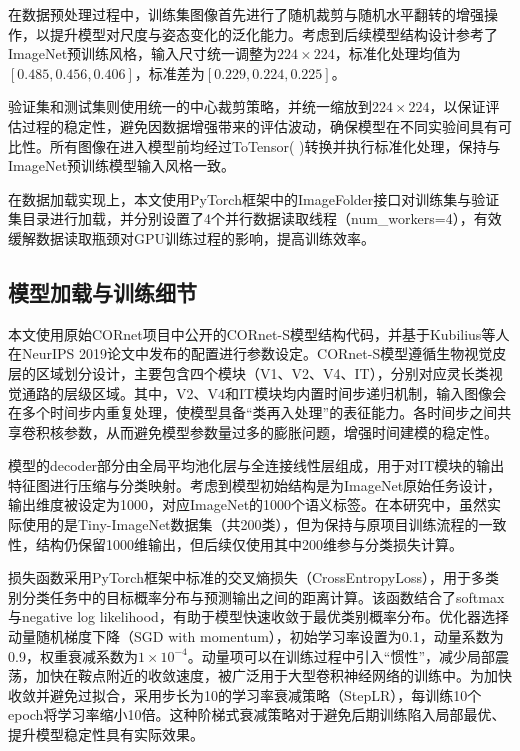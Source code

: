 在数据预处理过程中，训练集图像首先进行了随机裁剪与随机水平翻转的增强操作，以提升模型对尺度与姿态变化的泛化能力。考虑到后续模型结构设计参考了ImageNet预训练风格，输入尺寸统一调整为$224×224$，标准化处理均值为$[0.485,0.456,0.406]$，标准差为$[0.229,0.224,0.225]$。

验证集和测试集则使用统一的中心裁剪策略，并统一缩放到$224×224$，以保证评估过程的稳定性，避免因数据增强带来的评估波动，确保模型在不同实验间具有可比性。所有图像在进入模型前均经过ToTensor( )转换并执行标准化处理，保持与ImageNet预训练模型输入风格一致。

在数据加载实现上，本文使用PyTorch框架中的ImageFolder接口对训练集与验证集目录进行加载，并分别设置了4个并行数据读取线程（num\_workers=4），有效缓解数据读取瓶颈对GPU训练过程的影响，提高训练效率。


\subsection{模型加载与训练细节}

本文使用原始CORnet项目中公开的CORnet-S模型结构代码，并基于Kubilius等人在NeurIPS 2019论文中发布的配置进行参数设定\cite{kubilius2019brain}。CORnet-S模型遵循生物视觉皮层的区域划分设计，主要包含四个模块（V1、V2、V4、IT），分别对应灵长类视觉通路的层级区域。其中，V2、V4和IT模块均内置时间步递归机制，输入图像会在多个时间步内重复处理，使模型具备“类再入处理”的表征能力。各时间步之间共享卷积核参数，从而避免模型参数量过多的膨胀问题，增强时间建模的稳定性。

模型的decoder部分由全局平均池化层与全连接线性层组成，用于对IT模块的输出特征图进行压缩与分类映射。考虑到模型初始结构是为ImageNet原始任务设计，输出维度被设定为1000，对应ImageNet的1000个语义标签。在本研究中，虽然实际使用的是Tiny-ImageNet数据集（共200类），但为保持与原项目训练流程的一致性，结构仍保留1000维输出，但后续仅使用其中200维参与分类损失计算。

损失函数采用PyTorch框架中标准的交叉熵损失（CrossEntropyLoss），用于多类别分类任务中的目标概率分布与预测输出之间的距离计算。该函数结合了softmax与negative log likelihood，有助于模型快速收敛于最优类别概率分布\cite{mao2023cross}。优化器选择动量随机梯度下降（SGD with momentum），初始学习率设置为0.1，动量系数为0.9，权重衰减系数为$1\times 10^{-4}$。动量项可以在训练过程中引入“惯性”，减少局部震荡，加快在鞍点附近的收敛速度，被广泛用于大型卷积神经网络的训练中\cite{sutskever2013importance}。为加快收敛并避免过拟合，采用步长为10的学习率衰减策略（StepLR），每训练10个epoch将学习率缩小10倍。这种阶梯式衰减策略对于避免后期训练陷入局部最优、提升模型稳定性具有实际效果。

